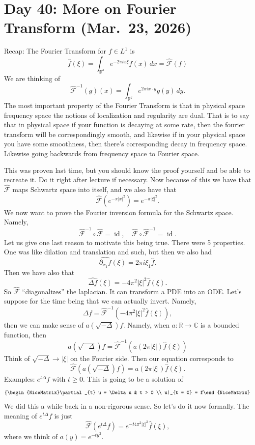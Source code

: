 \section{Day 40: More on Fourier Transform (Mar.\ 23, 2026)}
Recap: The Fourier Transform for \( f \in L^{1} \) is
\[ \hat f( \xi) = \int_{\mathbb{R}^{d}} e^{-2 \pi i x \xi} f(x) \, dx = \hat {\mathcal{F}}(f) \]
We are thinking of
\[ \hat {\mathcal{F}}^{-1}(g)(x) = \int_{\mathbb{R}^{d}} e^{2 \pi i x \cdot y} g(y) \, dy.  \]
The most important property of the Fourier Transform is that in physical space frequency space the notions of localization and regularity are dual. That is to say that in physical space if your function is decaying at some rate, then the fourier transform will be correspondingly smooth, and likewise if in your physical space you have some smoothness, then there's corresponding decay in frequency space. Likewise going backwards from frequency space to Fourier space.

This was proven last time, but you should know the proof yourself and be able to recreate it. Do it right after lecture if necessary. Now because of this we have that \( \hat {\mathcal{F}} \) maps Schwartz space into itself, and we also have that
\[ \hat {\mathcal{F}} \left( e^{- \pi |x|^{2}} \right) = e^{- \pi | \xi|^{2}}. \]
We now want to prove the Fourier inversion formula for the Schwartz space. Namely,
\[ \hat {\mathcal{F}}^{-1} \circ \hat {\mathcal{F}} = \operatorname{id}, \quad \hat {\mathcal{F}} \circ \hat {\mathcal{F}}^{-1} = \operatorname{id}.  \]
Let us give one last reason to motivate this being true. There were 5 properties. One was like dilation and translation and such, but then we also had
\[ \widehat{\partial_{x_{1}} f}( \xi) = 2 \pi i \xi_{1} \hat f. \]
Then we have also that
\[ \widehat{\Delta f}(\xi) = - 4 \pi^{2} | \xi|^{2} \hat f(\xi). \]
So \( \hat {\mathcal{F}} \) ``diagonalizes'' the laplacian. It can transform a PDE into an ODE\@. Let's suppose for the time being that we can actually invert. Namely,
\[ \Delta f = \hat {\mathcal{F}}^{-1} \left( -4 \pi^{2} | \xi|^{2} \hat f(\xi) \right), \]
then we can make sense of \(a \left( \sqrt{- \Delta}\right) f\). Namely, when \( a \colon \mathbb{R} \to \mathbb{C} \) is a bounded function, then
\[ a \left( \sqrt{- \Delta} \right) f = \hat {\mathcal{F}}^{-1} \left( a(2 \pi | \xi|) \hat f( \xi) \right) \]
Think of \( \sqrt{- \Delta} \to | \xi| \) on the Fourier side. Then our equation corresponds to
\[ \hat {\mathcal{F}} \left( a( \sqrt{- \Delta}) f \right) = a(2 \pi | \xi|) \hat f ( \xi). \]
Examples: \( e^{t \Delta}f \) with \( t \ge 0 \). This is going to be a solution of
\[ \left\{\begin{NiceMatrix}\partial_{t} u = \Delta u & t > 0 \\ u|_{t = 0} = f\end{NiceMatrix}\right.  \]
We did this a while back in a non-rigorous sense. So let's do it now formally. The meaning of \( e^{t \Delta}f \) is just
\[ \hat {\mathcal{F}} \left( e^{t \Delta} f \right) = e^{- t 4 \pi^{2} | \xi|^{2}} \hat f( \xi), \]
where we think of \( a(y) = e^{-t y^{2}} \).

